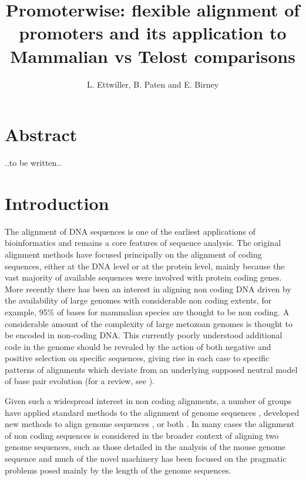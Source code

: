 \documentclass{article} \usepackage{a4}
\title{Promoterwise: flexible alignment of promoters and its application to Mammalian vs Telost comparisons}
\author{L. Ettwiller, B. Paten and E. Birney}
\begin{document}
\maketitle
 
\section{Abstract}

..to be written..

\section{Introduction}

The alignment of DNA sequences is one of the earliest applications of
bioinformatics  and remains a
core features of sequence analysis. The original alignment methods
have focused principally on the alignment of coding sequences, either
at the DNA level or at the protein level, mainly because the vast
majority of available sequences were involved with protein coding
genes. More recently there has been an interest in aligning non coding
DNA driven by the availability of large genomes with considerable non
coding extents, for example, 95\% of bases for mammalian species are
thought to be non coding. A considerable amount of the complexity of
large metozoan genomes is thought to be encoded in non-coding
DNA. This currently poorly understood additional code in the genome
should be revealed by the action of both negative and positive
selection on specific sequences, giving rise in each case to specific
patterns of alignments which deviate from an underlying supposed
neutral model of base pair evolution (for a review, see
).

Given such a widespread interest in non coding alignments, a number of
groups have applied standard methods to the alignment of genome
sequences , developed new methods to align genome
sequences , or both . In many
cases the alignment of non coding sequences is considered in the
broader context of aligning two genome sequences, such as those
detailed in the analysis of the mouse genome sequence
 and much of the novel machinery has been focused
on the pragmatic problems posed mainly by the length of the genome
sequences.
\end{document}
